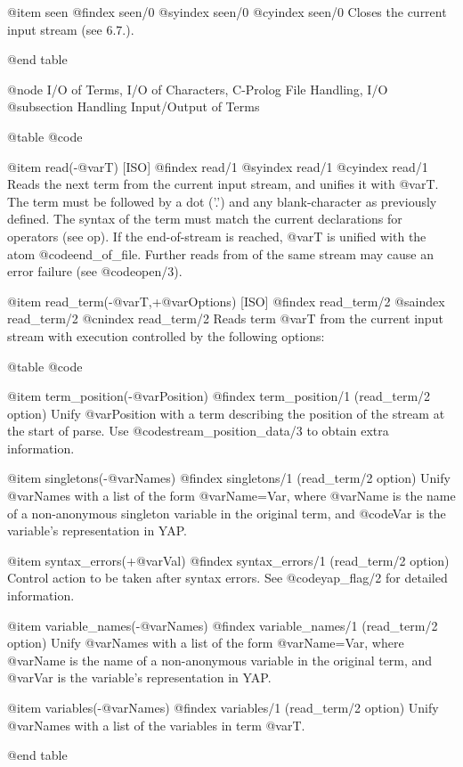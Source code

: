 {{{{{{@item seen
@findex seen/0
@syindex seen/0
@cyindex seen/0
Closes the current input stream (see 6.7.).

@end table

@node I/O of Terms, I/O of Characters, C-Prolog File Handling, I/O
@subsection Handling Input/Output of Terms

@table @code

@item read(-@var{T}) [ISO]
@findex read/1
@syindex read/1
@cyindex read/1
Reads the next term from the current input stream, and unifies it with
@var{T}. The term must be followed by a dot ('.') and any blank-character
as previously defined. The syntax of the term must match the current
declarations for operators (see op). If the end-of-stream is reached, 
@var{T} is unified with the atom @code{end_of_file}. Further reads from of 
the same stream may cause an error failure (see @code{open/3}).

@item read_term(-@var{T},+@var{Options}) [ISO]
@findex read_term/2
@saindex read_term/2
@cnindex read_term/2
Reads term @var{T} from the current input stream with execution
controlled by the following options:

@table @code

@item  term_position(-@var{Position})
@findex term_position/1 (read_term/2 option)
Unify @var{Position} with a term describing the position of the stream
at the start of parse. Use @code{stream_position_data/3} to obtain extra
information.

@item  singletons(-@var{Names})
@findex singletons/1 (read_term/2 option)
Unify @var{Names} with a list of the form @var{Name=Var}, where
@var{Name} is the name of a non-anonymous singleton variable in the
original term, and @code{Var} is the variable's representation in
YAP.

@item  syntax_errors(+@var{Val})
@findex syntax_errors/1 (read_term/2 option)
Control action to be taken after syntax errors. See @code{yap_flag/2}
for detailed information.

@item  variable_names(-@var{Names})
@findex variable_names/1 (read_term/2 option)
Unify @var{Names} with a list of the form @var{Name=Var}, where @var{Name} is
the name of a non-anonymous variable in the original term, and @var{Var}
is the variable's representation in YAP.

@item  variables(-@var{Names})
@findex variables/1 (read_term/2 option)
Unify @var{Names} with a list of the variables in term @var{T}.

@end table

}}}}}}
